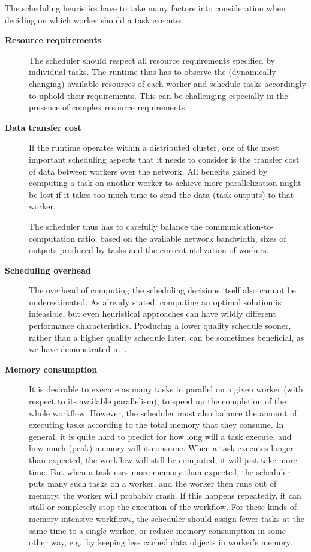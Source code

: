The scheduling heuristics have to take many factors into consideration when deciding on which
worker should a task execute:

\begin{description}
	\item[\textbf{Resource requirements}] The scheduler should respect all resource requirements specified by individual tasks. The runtime
		thus has to observe the (dynamically changing) available resources of each worker and schedule
		tasks accordingly to uphold their requirements. This can be challenging especially in the presence
		of complex resource requirements.
	\item[\textbf{Data transfer cost}] If the runtime operates within a distributed cluster, one of the most important scheduling aspects
		that it needs to consider is the transfer cost of data between workers over the network. All
		benefits gained by computing a task on another worker to achieve more parallelization might be lost
		if it takes too much time to send the data (task outputs) to that worker.

		The scheduler thus has to carefully balance the communication-to-computation ratio, based on the
		available network bandwidth, sizes of outputs produced by tasks and the current utilization of
		workers.
	\item[\textbf{Scheduling overhead}] The overhead of computing the scheduling decisions itself also cannot be underestimated. As already
		stated, computing an optimal solution is infeasible, but even heuristical approaches can have
		wildly different performance characteristics. Producing a lower quality schedule sooner, rather
		than a higher quality schedule later, can be sometimes beneficial, as we have demonstrated
		in~\cite{estee, rsds}.
	\item[\textbf{Memory consumption}] It is desirable to execute as many tasks in parallel on a given worker (with respect to its
		available parallelism), to speed up the completion of the whole workflow. However, the scheduler
		must also balance the amount of executing tasks according to the total memory that they consume. In
		general, it is quite hard to predict for how long will a task execute, and how much (peak) memory
		will it consume. When a task executes longer than expected, the workflow will still be computed, it
		will just take more time. But when a task uses more memory than expected, the scheduler puts many
		such tasks on a worker, and the worker then runs out of memory, the worker will probably crash. If
		this happens repeatedly, it can stall or completely stop the execution of the workflow. For these
		kinds of memory-intensive workflows, the scheduler should assign fewer tasks at the same time to a
		single worker, or reduce memory consumption in some other way, e.g.\ by keeping less cached data
		objects in worker's memory.
\end{description}
